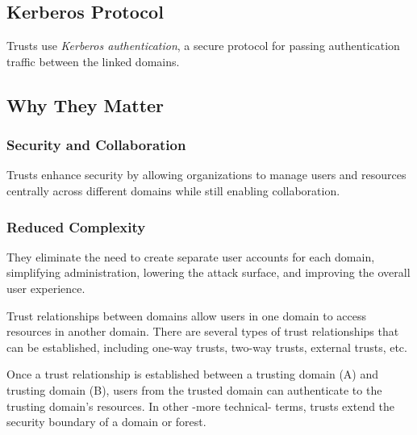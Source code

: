 \subsection{Kerberos Protocol}
Trusts use \textit{Kerberos authentication}, a secure protocol for passing authentication traffic between the linked domains.
\subsection{Why They Matter}
\subsubsection{Security and Collaboration}
Trusts enhance security by allowing organizations to manage users and resources centrally across different domains while still enabling collaboration.
\subsubsection{Reduced Complexity}
They eliminate the need to create separate user accounts for each domain, simplifying administration, lowering the attack surface, and improving the overall user experience.

Trust relationships between domains allow users in one domain to access resources in another domain. There are several types of trust relationships that can be established, including one-way trusts, two-way trusts, external trusts, etc.

Once a trust relationship is established between a trusting domain (A) and trusting domain (B), users from the trusted domain can authenticate to the trusting domain's resources. In other -more technical- terms, trusts extend the security boundary of a domain or forest.


